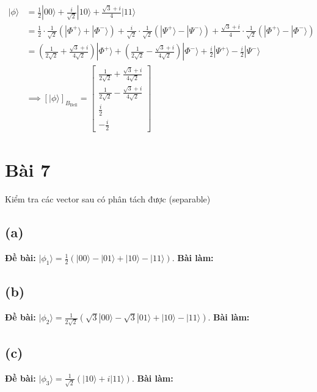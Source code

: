 \begin{align*}
    |\phi\rangle & = \frac{1}{2}|00\rangle + \frac{i}{\sqrt{2}}|10\rangle + \frac{\sqrt{3}+i}{4}|11\rangle \\
    & = \frac{1}{2}\cdot\frac{1}{\sqrt{2}}(|\Phi^{+}\rangle + |\Phi^{-}\rangle) + \frac{i}{\sqrt{2}}\cdot\frac{1}{\sqrt{2}}(|\Psi^{+}\rangle - |\Psi^{-}\rangle) + \frac{\sqrt{3}+i}{4}\cdot\frac{1}{\sqrt{2}}(|\Phi^{+}\rangle - |\Phi^{-}\rangle) \\
    & = \left(\frac{1}{2\sqrt{2}} + \frac{\sqrt{3}+i}{4\sqrt{2}}\right)|\Phi^{+}\rangle + \left(\frac{1}{2\sqrt{2}} - \frac{\sqrt{3}+i}{4\sqrt{2}}\right)|\Phi^{-}\rangle + \frac{i}{2}|\Psi^{+}\rangle - \frac{i}{2}|\Psi^{-}\rangle\\
    &\implies
    [|\phi\rangle]_{B_{\mathrm{Bell}}} = \begin{bmatrix}
                                             \frac{1}{2\sqrt{2}} + \frac{\sqrt{3}+i}{4\sqrt{2}} \\
                                             \frac{1}{2\sqrt{2}} - \frac{\sqrt{3}+i}{4\sqrt{2}} \\
                                             \frac{i}{2}                                      \\
                                             -\frac{i}{2}
                                         \end{bmatrix}
\end{align*}

\section{Bài 7}
Kiểm tra các vector sau có phân tách được (separable)

\subsection{(a)}
\textbf{Đề bài:} $|\phi_{1}\rangle=\frac{1}{2}(|00\rangle-|01\rangle+|10\rangle-|11\rangle).$
\textbf{Bài làm:}

\subsection{(b)}
\textbf{Đề bài:} $|\phi_{2}\rangle=\frac{1}{2\sqrt{2}}(\sqrt{3}|00\rangle-\sqrt{3}|01\rangle+|10\rangle-|11\rangle)$.
\textbf{Bài làm:}

\subsection{(c)}
\textbf{Đề bài:} $|\phi_{3}\rangle=\frac{1}{\sqrt{2}}(|10\rangle+i|11\rangle)$.
\textbf{Bài làm:}

